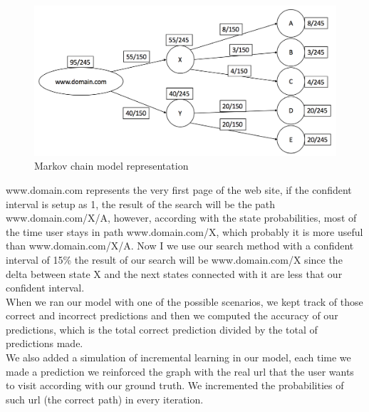 \begin{figure}[!htp]
    \centering
    \includegraphics[width=\textwidth]{markov_chain}
    \caption{Markov chain model representation}\label{fig:markov_chain}
\end{figure}

www.domain.com represents the very first page of the web site, if the confident interval is setup as 1, the result of the search will be the path www.domain.com/X/A, however, according with the state probabilities, most of the time user stays in path www.domain.com/X, which probably it is more useful than www.domain.com/X/A. Now I we use our search method with a confident interval of 15\% the result of our search will be www.domain.com/X since the delta between state X and the next states connected with it are less that our confident interval.
\\[2ex]
When we ran our model with one of the possible scenarios, we kept track of those correct and incorrect predictions and then we computed the accuracy of our predictions, which is the total correct prediction divided by the total of predictions made. 
\\[2ex]
We also added a simulation of incremental learning in our model, each time we made a prediction we reinforced the graph with the real url that the user wants to visit according with our ground truth. We incremented the probabilities of such url (the correct path) in every iteration.